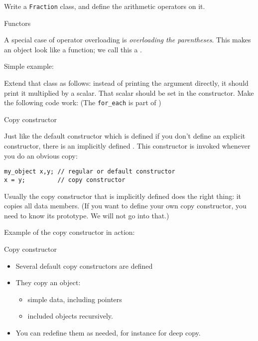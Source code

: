 \begin{exercise}
  Write a \lstinline{Fraction} class, and define the arithmetic operators on it.
\end{exercise}

 {Functors}

A special case of operator overloading is
%
\emph{overloading the parentheses}. This makes an object look like a
function; we call this a .

Simple example:
%

\begin{exercise}
  \label{ex:functor2}
  Extend that class as follows: instead of printing the argument
  directly, it should print it multiplied by a scalar. That scalar
  should be set in the constructor. Make the following code work:
  (The \lstinline{for_each} is part of )
\end{exercise}


 {Copy constructor}

Just like the default constructor which is defined if you don't define
an explicit constructor, there is an implicitly defined
. This constructor is invoked whenever
you do an obvious copy:
\begin{lstlisting}
my_object x,y; // regular or default constructor
x = y;         // copy constructor
\end{lstlisting}
Usually the copy constructor that is implicitly defined does the right
thing: it copies all data members. (If you want to define your own copy
constructor, you need to know its prototype. We will not go into that.)

Example of the copy constructor in action:
%

\begin{slide}{Copy constructor}
  \label{sl:class-copy}
  \begin{multicols}{2}
    \begin{itemize}
    \item
      Several default copy constructors are defined
    \item They copy an object:
      \begin{itemize}
      \item simple data, including pointers
      \item included objects recursively.
      \end{itemize}
    \item You can redefine them as needed, for instance for deep copy.
    \end{itemize}
    \vfill\columnbreak
  \end{multicols}
\end{slide}

